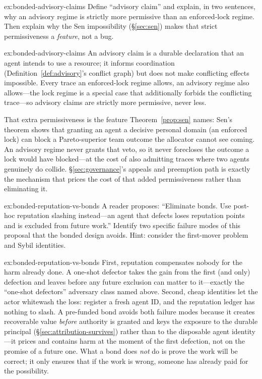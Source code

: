\documentclass[11pt,a4paper]{article}
\theoremstyle{definition}
\theoremstyle{remark}
\begin{document}
\begin{pdexercise}[kind=Check,rating=1]{ex:bonded-advisory-claims}
Define ``advisory claim'' and explain, in two sentences, why an advisory regime is strictly more permissive than an enforced-lock regime. Then explain why the Sen impossibility (\S\ref{sec:sen}) makes that strict permissiveness a \emph{feature}, not a bug.
\end{pdexercise}
\begin{pdsolution}{ex:bonded-advisory-claims}
An advisory claim is a durable declaration that an agent intends to use a resource; it informs coordination (Definition~\ref{def:advisory}'s conflict graph) but does not make conflicting effects impossible. Every trace an enforced-lock regime allows, an advisory regime also allows---the lock regime is a special case that additionally forbids the conflicting trace---so advisory claims are strictly more permissive, never less.

That extra permissiveness is the feature Theorem~\ref{prop:sen} names: Sen's theorem shows that granting an agent a decisive personal domain (an enforced lock) can block a Pareto-superior team outcome the allocator cannot see coming. An advisory regime never grants that veto, so it never forecloses the outcome a lock would have blocked---at the cost of also admitting traces where two agents genuinely do collide. \S\ref{sec:governance}'s appeals and preemption path is exactly the mechanism that prices the cost of that added permissiveness rather than eliminating it.
\end{pdsolution}


\begin{pdexercise}[kind=Check,rating=1]{ex:bonded-reputation-vs-bonds}
A reader proposes: ``Eliminate bonds. Use post-hoc reputation slashing instead---an agent that defects loses reputation points and is excluded from future work.'' Identify two specific failure modes of this proposal that the bonded design avoids. Hint: consider the first-mover problem and Sybil identities.
\end{pdexercise}
\begin{pdsolution}{ex:bonded-reputation-vs-bonds}
First, reputation compensates nobody for the harm already done. A one-shot defector takes the gain from the first (and only) defection and leaves before any future exclusion can matter to it---exactly the ``one-shot defectors'' adversary class named above. Second, cheap identities let the actor whitewash the loss: register a fresh agent ID, and the reputation ledger has nothing to slash. A pre-funded bond avoids both failure modes because it creates recoverable value \emph{before} authority is granted and keys the exposure to the durable principal (\S\ref{sec:attribution-survives}) rather than to the disposable agent identity---it prices and contains harm at the moment of the first defection, not on the promise of a future one. What a bond does \emph{not} do is prove the work will be correct; it only ensures that if the work is wrong, someone has already paid for the possibility.
\end{pdsolution}
\end{document}
